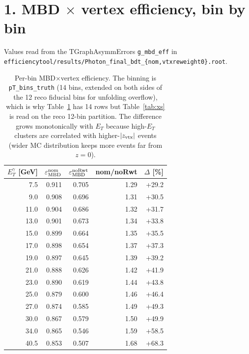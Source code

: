 \documentclass[11pt,a4paper]{article}
\begin{document}
\section*{1. MBD $\times$ vertex efficiency, bin by bin}
\vspace{-0.5em}

Values read from the TGraphAsymmErrors \texttt{g\_mbd\_eff} in
\texttt{efficiencytool/results/Photon\_final\_bdt\_\{nom,vtxreweight0\}.root}.

\begin{table}[H]
\centering\small
\begin{tabular}{rrrrr}
\toprule
$E_T^\gamma$ [GeV] & $\varepsilon_{\rm MBD}^{\rm nom}$ & $\varepsilon_{\rm MBD}^{\rm noRwt}$ & nom/noRwt & $\Delta$ [\%]\\
\midrule
 7.5 & 0.911 & 0.705 & 1.29 & +29.2 \\
 9.0 & 0.908 & 0.696 & 1.31 & +30.5 \\
11.0 & 0.904 & 0.686 & 1.32 & +31.7 \\
13.0 & 0.901 & 0.673 & 1.34 & +33.8 \\
15.0 & 0.899 & 0.664 & 1.35 & +35.5 \\
17.0 & 0.898 & 0.654 & 1.37 & +37.3 \\
19.0 & 0.897 & 0.645 & 1.39 & +39.2 \\
21.0 & 0.888 & 0.626 & 1.42 & +41.9 \\
23.0 & 0.890 & 0.619 & 1.44 & +43.8 \\
25.0 & 0.879 & 0.600 & 1.46 & +46.4 \\
27.0 & 0.874 & 0.585 & 1.49 & +49.3 \\
30.0 & 0.867 & 0.579 & 1.50 & +49.9 \\
34.0 & 0.865 & 0.546 & 1.59 & +58.5 \\
40.5 & 0.853 & 0.507 & 1.68 & +68.3 \\
\bottomrule
\end{tabular}
\caption{Per-bin MBD$\times$vertex efficiency. The binning is \texttt{pT\_bins\_truth} (14 bins, extended on both sides of the 12 reco fiducial bins for unfolding overflow), which is why Table~\ref{tab:mbdeff} has 14 rows but Table~\ref{tab:xs} is read on the reco 12-bin partition. The difference grows monotonically with $E_T$ because high-$E_T$ clusters are correlated with higher-$|z_{\rm vtx}|$ events (wider MC distribution keeps more events far from $z=0$).}
\label{tab:mbdeff}
\end{table}
\end{document}
